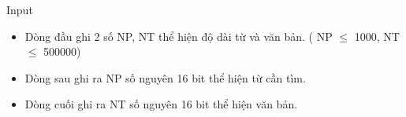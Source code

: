 Input
\begin{itemize}
	\item Dòng đầu ghi 2 số NP, NT thể hiện độ dài từ và văn bản. ( NP  $\le$  1000, NT  $\le$  500000)
\end{itemize}
\begin{itemize}
	\item Dòng sau ghi ra NP số nguyên 16 bit thể hiện từ cần tìm.
\end{itemize}
\begin{itemize}
	\item Dòng cuối ghi ra NT số nguyên 16 bit thể hiện văn bản.
\end{itemize}